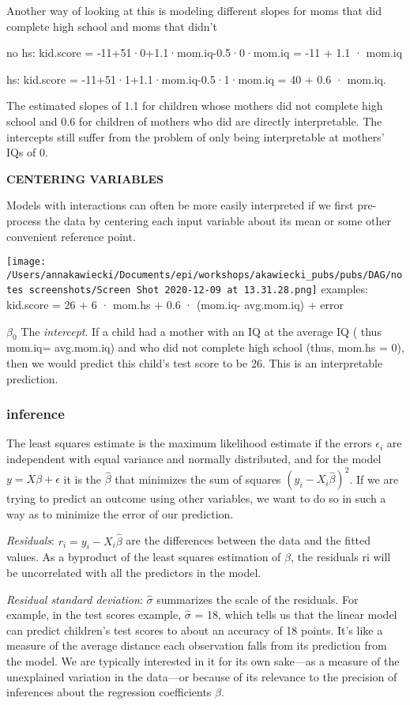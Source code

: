 \documentclass[
]{article}
\begin{document}
Another way of looking at this is modeling different slopes for moms
that did complete high school and moms that didn't

no hs: kid.score = -11+51·0+1.1·mom.iq-0.5·0·mom.iq = -11 + 1.1 · mom.iq

hs: kid.score = -11+51·1+1.1·mom.iq-0.5·1·mom.iq = 40 + 0.6 · mom.iq.

The estimated slopes of 1.1 for children whose mothers did not complete
high school and 0.6 for children of mothers who did are directly
interpretable. The intercepts still suffer from the problem of only
being interpretable at mothers' IQs of 0.

\textbf{CENTERING VARIABLES}

Models with interactions can often be more easily interpreted if we
first pre-process the data by centering each input variable about its
mean or some other convenient reference point.

\texttt{[image: /Users/annakawiecki/Documents/epi/workshops/akawiecki\_pubs/pubs/DAG/notes screenshots/Screen Shot 2020-12-09 at 13.31.28.png]}
examples: kid.score = 26 + 6 · mom.hs + 0.6 · (mom.iq- avg.mom.iq) +
error

\(\beta_0\) The \emph{intercept}. If a child had a mother with an IQ at
the average IQ ( thus mom.iq= avg.mom.iq) and who did not complete high
school (thus, mom.hs = 0), then we would predict this child's test score
to be 26. This is an interpretable prediction.

\hypertarget{inference}{%
\subsubsection{inference}\label{inference}}

The least squares estimate is the maximum likelihood estimate if the
errors \(\epsilon_i\) are independent with equal variance and normally
distributed, and for the model \(y=X\beta+\epsilon\) it is the
\(\hat{\beta}\) that minimizes the sum of squares
\((y_i- X_i\hat{\beta})^{2}\). If we are trying to predict an outcome
using other variables, we want to do so in such a way as to minimize the
error of our prediction.

\emph{Residuals}: \(r_i= y_i- X_i\hat{\beta}\) are the differences
between the data and the fitted values. As a byproduct of the least
squares estimation of \(\beta\), the residuals ri will be uncorrelated
with all the predictors in the model.

\emph{Residual standard deviation}: \(\hat{\sigma}\) summarizes the
scale of the residuals. For example, in the test scores example,
\(\hat{\sigma}\) = 18, which tells us that the linear model can predict
children's test scores to about an accuracy of 18 points. It's like a
measure of the average distance each observation falls from its
prediction from the model. We are typically interested in it for its own
sake---as a measure of the unexplained variation in the data---or
because of its relevance to the precision of inferences about the
regression coefficients \(\beta\).
\end{document}
